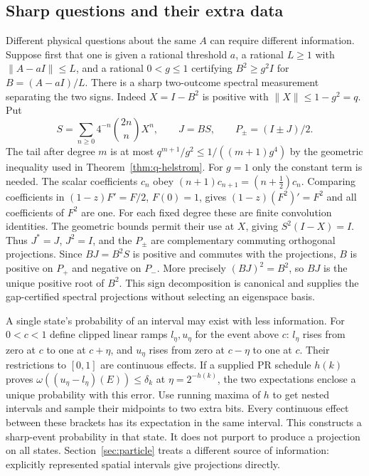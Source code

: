 \subsection{Sharp questions and their extra data}
Different physical questions about the same $A$ can require different information. Suppose first that one is given a rational threshold $a$, a rational $L\ge1$ with $\|A-aI\|\le L$, and a rational $0<g\le1$ certifying $B^2\ge g^2I$ for $B=(A-aI)/L$. There is a sharp two-outcome spectral measurement separating the two signs. Indeed $X=I-B^2$ is positive with $\|X\|\le1-g^2=q$. Put
\[
 S=\sum_{n\ge0} 4^{-n}{2n\choose n}X^n,\qquad J=BS,\qquad P_{\pm}=(I\pm J)/2 .
\]
The tail after degree $m$ is at most $q^{m+1}/g^2\le 1/((m+1)g^4)$ by the geometric inequality used in Theorem~\ref{thm:q-helstrom}. For $g=1$ only the constant term is needed. The scalar coefficients $c_n$ obey $(n+1)c_{n+1}=(n+\tfrac12)c_n$. Comparing coefficients in $(1-z)F'=F/2$, $F(0)=1$, gives $(1-z)(F^2)'=F^2$ and all coefficients of $F^2$ are one. For each fixed degree these are finite convolution identities. The geometric bounds permit their use at $X$, giving $S^2(I-X)=I$. Thus $J^*=J$, $J^2=I$, and the $P_\pm$ are complementary commuting orthogonal projections. Since $BJ=B^2S$ is positive and commutes with the projections, $B$ is positive on $P_+$ and negative on $P_-$. More precisely $(BJ)^2=B^2$, so $BJ$ is the unique positive root of $B^2$. This sign decomposition is canonical and supplies the gap-certified spectral projections without selecting an eigenspace basis.

A single state's probability of an interval may exist with less information. For $0<c<1$ define clipped linear ramps $l_\eta,u_\eta$ for the event above $c$: $l_\eta$ rises from zero at $c$ to one at $c+\eta$, and $u_\eta$ rises from zero at $c-\eta$ to one at $c$. Their restrictions to $[0,1]$ are continuous effects. If a supplied PR schedule $h(k)$ proves $\omega((u_\eta-l_\eta)(E))\le\delta_k$ at $\eta=2^{-h(k)}$, the two expectations enclose a unique probability with this error. Use running maxima of $h$ to get nested intervals and sample their midpoints to two extra bits. Every continuous effect between these brackets has its expectation in the same interval. This constructs a sharp-event probability in that state. It does not purport to produce a projection on all states. Section~\ref{sec:particle} treats a different source of information: explicitly represented spatial intervals give projections directly.

